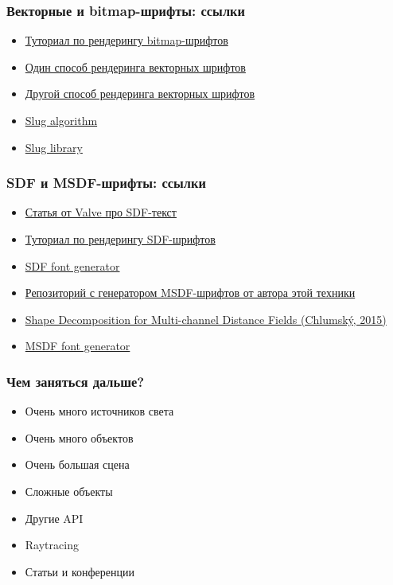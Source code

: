 \documentclass{beamer}
\begin{document}
\begin{frame}[fragile]
\frametitle{Векторные и bitmap-шрифты: ссылки}
\begin{itemize}
\item \href{https://learnopengl.com/In-Practice/Text-Rendering}{Туториал по рендерингу bitmap-шрифтов}
\item \href{https://wdobbie.com/post/gpu-text-rendering-with-vector-textures}{Один способ рендеринга векторных шрифтов}
\item \href{https://medium.com/@evanwallace/easy-scalable-text-rendering-on-the-gpu-c3f4d782c5ac}{Другой способ рендеринга векторных шрифтов}
\item \href{https://jcgt.org/published/0006/02/02}{Slug algorithm}
\item \href{https://sluglibrary.com}{Slug library}
\end{itemize}
\end{frame}

\begin{frame}[fragile]
\frametitle{SDF и MSDF-шрифты: ссылки}
\begin{itemize}
\item \href{https://steamcdn-a.akamaihd.net/apps/valve/2007/SIGGRAPH2007_AlphaTestedMagnification.pdf}{Статья от Valve про SDF-текст}
\item \href{https://blog.mapbox.com/drawing-text-with-signed-distance-fields-in-mapbox-gl-b0933af6f817}{Туториал по рендерингу SDF-шрифтов}
\item \href{https://evanw.github.io/font-texture-generator/}{SDF font generator}
\item \href{https://github.com/Chlumsky/msdfgen}{Репозиторий с генератором MSDF-шрифтов от автора этой техники}
\item \href{https://github.com/Chlumsky/msdfgen/files/3050967/thesis.pdf}{Shape Decomposition for Multi-channel Distance Fields (Chlumský, 2015)}
\item \href{https://msdf-bmfont.donmccurdy.com/}{MSDF font generator}
\end{itemize}
\end{frame}

\begin{frame}[fragile]
\frametitle{Чем заняться дальше?}
\begin{itemize}
\item Очень много источников света
\item Очень много объектов
\item Очень большая сцена
\item Сложные объекты
\item Другие API
\item Raytracing
\item Статьи и конференции
\end{itemize}
\end{frame}
\end{document}
